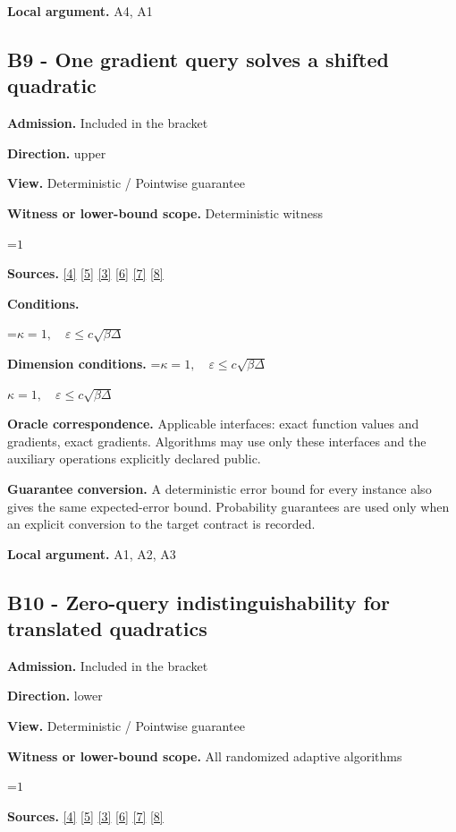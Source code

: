 \documentclass[10pt,a4paper]{article}
\newcommand{\AtlasMath}[1]{\par\begingroup\centering\setbox0=\hbox{$\displaystyle #1$}\ifdim\wd0>1.4\linewidth\typeout{ATLAS WIDE FORMULA: \the\wd0}\fi\ifdim\wd0>\linewidth\resizebox{\linewidth}{!}{\box0}\else\box0\fi\par\endgroup}
\newcommand{\AtlasInlineMath}[1]{\begingroup\setbox0=\hbox{$#1$}\ifdim\wd0>.4\linewidth\endgroup\AtlasMath{#1}\else\endgroup$#1$\fi}
\begin{document}
\textbf{Local argument.} A4, A1

\subsection{B9 - One gradient query solves a shifted quadratic}
\textbf{Admission.} Included in the bracket

\textbf{Direction.} upper

\textbf{View.} Deterministic / Pointwise guarantee

\textbf{Witness or lower-bound scope.} Deterministic witness

\AtlasMath{1}
\textbf{Sources.} \href{https://arxiv.org/pdf/2101.09740v2}{[4]} \href{https://arxiv.org/pdf/2609.33360v2}{[5]} \href{https://arxiv.org/pdf/2609.10874}{[3]} \href{https://arxiv.org/pdf/1405.4980}{[6]} \href{https://www2.isye.gatech.edu/~nemirovs/MOR_AccuracyCertificates.pdf}{[7]} \href{https://arxiv.org/pdf/2609.20701}{[8]}

\textbf{Conditions.} 
\AtlasMath{\kappa=1,\quad\varepsilon\le c\sqrt{\beta\Delta}}


\textbf{Dimension conditions.} \AtlasInlineMath{\kappa=1,\quad\varepsilon\le c\sqrt{\beta\Delta}}

\textbf{Oracle correspondence.} Applicable interfaces: exact function values and gradients, exact gradients. Algorithms may use only these interfaces and the auxiliary operations explicitly declared public.

\textbf{Guarantee conversion.} A deterministic error bound for every instance also gives the same expected-error bound. Probability guarantees are used only when an explicit conversion to the target contract is recorded.

\textbf{Local argument.} A1, A2, A3

\subsection{B10 - Zero-query indistinguishability for translated quadratics}
\textbf{Admission.} Included in the bracket

\textbf{Direction.} lower

\textbf{View.} Deterministic / Pointwise guarantee

\textbf{Witness or lower-bound scope.} All randomized adaptive algorithms

\AtlasMath{1}
\textbf{Sources.} \href{https://arxiv.org/pdf/2101.09740v2}{[4]} \href{https://arxiv.org/pdf/2609.33360v2}{[5]} \href{https://arxiv.org/pdf/2609.10874}{[3]} \href{https://arxiv.org/pdf/1405.4980}{[6]} \href{https://www2.isye.gatech.edu/~nemirovs/MOR_AccuracyCertificates.pdf}{[7]} \href{https://arxiv.org/pdf/2609.20701}{[8]}
\end{document}
